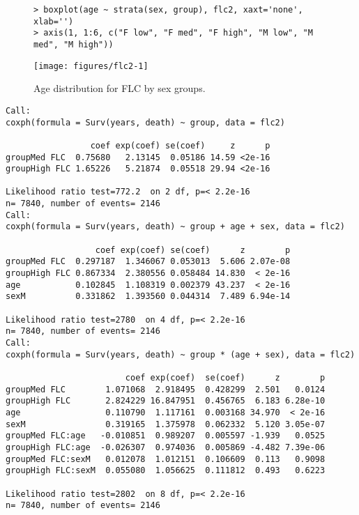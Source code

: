 \documentclass{article}\usepackage[]{graphicx}\usepackage[]{xcolor}
\makeatletter
\def\maxwidth{ %
  \ifdim\Gin@nat@width>\linewidth
    \linewidth
  \else
    \Gin@nat@width
  \fi
}
\newenvironment{kframe}{%
 \def\at@end@of@kframe{}%
 \ifinner\ifhmode%
  \def\at@end@of@kframe{\end{minipage}}%
  \begin{minipage}{\columnwidth}%
 \fi\fi%
 \def\FrameCommand##1{\hskip\@totalleftmargin \hskip-\fboxsep
 \colorbox{shadecolor}{##1}\hskip-\fboxsep
     \hskip-\linewidth \hskip-\@totalleftmargin \hskip\columnwidth}%
 \MakeFramed {\advance\hsize-\width
   \@totalleftmargin\z@ \linewidth\hsize
   \@setminipage}}%
 {\par\unskip\endMakeFramed%
 \at@end@of@kframe}
\newenvironment{knitrout}{}{} %
\makeatother
\begin{document}
\begin{figure}
\begin{knitrout}
\color{fgcolor}\begin{kframe}
\begin{verbatim}
> boxplot(age ~ strata(sex, group), flc2, xaxt='none', xlab='')
> axis(1, 1:6, c("F low", "F med", "F high", "M low", "M med", "M high"))
\end{verbatim}
\end{kframe}
\texttt{[image: figures/flc2-1]} 
\end{knitrout}
  \caption{Age distribution for FLC by sex groups.}
  \label{flc2}
\end{figure}

\begin{knitrout}
\color{fgcolor}\begin{kframe}
\begin{verbatim}
Call:
coxph(formula = Surv(years, death) ~ group, data = flc2)

                 coef exp(coef) se(coef)     z      p
groupMed FLC  0.75680   2.13145  0.05186 14.59 <2e-16
groupHigh FLC 1.65226   5.21874  0.05518 29.94 <2e-16

Likelihood ratio test=772.2  on 2 df, p=< 2.2e-16
n= 7840, number of events= 2146 
Call:
coxph(formula = Surv(years, death) ~ group + age + sex, data = flc2)

                  coef exp(coef) se(coef)      z        p
groupMed FLC  0.297187  1.346067 0.053013  5.606 2.07e-08
groupHigh FLC 0.867334  2.380556 0.058484 14.830  < 2e-16
age           0.102845  1.108319 0.002379 43.237  < 2e-16
sexM          0.331862  1.393560 0.044314  7.489 6.94e-14

Likelihood ratio test=2780  on 4 df, p=< 2.2e-16
n= 7840, number of events= 2146 
Call:
coxph(formula = Surv(years, death) ~ group * (age + sex), data = flc2)

                        coef exp(coef)  se(coef)      z        p
groupMed FLC        1.071068  2.918495  0.428299  2.501   0.0124
groupHigh FLC       2.824229 16.847951  0.456765  6.183 6.28e-10
age                 0.110790  1.117161  0.003168 34.970  < 2e-16
sexM                0.319165  1.375978  0.062332  5.120 3.05e-07
groupMed FLC:age   -0.010851  0.989207  0.005597 -1.939   0.0525
groupHigh FLC:age  -0.026307  0.974036  0.005869 -4.482 7.39e-06
groupMed FLC:sexM   0.012078  1.012151  0.106609  0.113   0.9098
groupHigh FLC:sexM  0.055080  1.056625  0.111812  0.493   0.6223

Likelihood ratio test=2802  on 8 df, p=< 2.2e-16
n= 7840, number of events= 2146 
\end{verbatim}
\end{kframe}
\end{knitrout}
\end{document}
